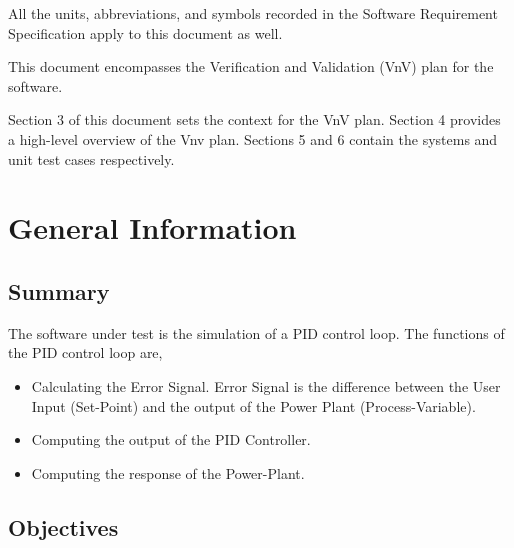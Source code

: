 \documentclass[12pt, titlepage]{article}
\begin{document}
All the units, abbreviations, and symbols recorded in the Software Requirement 
Specification \cite{SRS} apply to this document as well.

\newpage


This document encompasses the Verification and Validation (VnV) plan for the
\progname{} software. 

Section 3 of this document sets the context for the VnV plan. Section 4  provides
a high-level overview of the Vnv plan. Sections 5 and 6 contain the systems and 
unit test cases respectively. 


\section{General Information}

\subsection{Summary}


The software under test is the simulation of a PID control loop. The functions of 
the PID control loop are,

\begin{itemize}
\item Calculating the Error Signal. Error Signal is the difference between the User 
Input (Set-Point) and the output of the Power Plant (Process-Variable).
\item Computing the output of the PID Controller.
\item Computing the response of the Power-Plant.
\end{itemize}

\subsection{Objectives}

  
\end{document}
